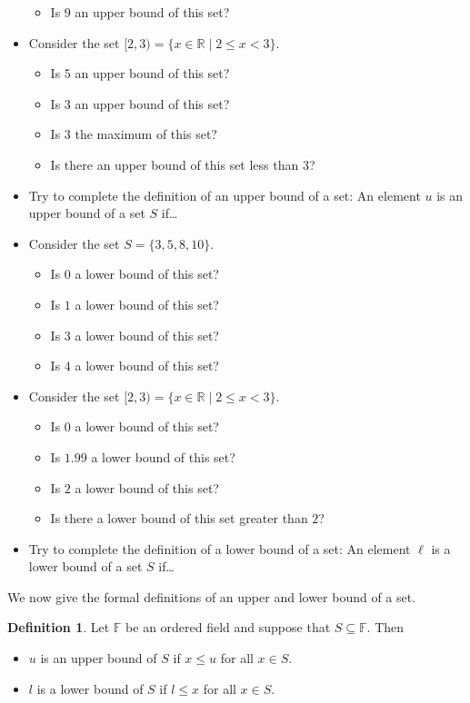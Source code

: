 \documentclass[11pt]{article}
\newenvironment{task}
	{\begin{mdframed}[linecolor=lightgray, linewidth=3pt]\raggedright}
	{\end{mdframed}}
\theoremstyle{definition}
\newtheorem{definition}[theorem]{Definition}
\begin{document}
\begin{task}
\begin{itemize}
\begin{itemize}
        \item Is $9$ an upper bound of this set?
      \end{itemize}
    \item Consider the set $[2,3) = \{ x \in\mathbb{R} \mid 2 \leq x < 3\}$.
        \begin{itemize}
          \item Is $5$ an upper bound of this set?
          \item Is $3$ an upper bound of this set?
          \item Is $3$ the maximum of this set?
          \item Is there an upper bound of this set less than $3$?
        \end{itemize}
      \item Try to complete the definition of an upper bound of a set: An element $u$ is an upper bound of
        a set $S$ if\dots
    \item Consider the set $S = \{ 3, 5, 8, 10\}$.
      \begin{itemize}
        \item Is $0$ a lower bound of this set?
        \item Is $1$ a lower bound of this set?
        \item Is $3$ a lower bound of this set?
        \item Is $4$ a lower bound of this set?
      \end{itemize}
    \item Consider the set $[2,3) = \{ x \in\mathbb{R} \mid 2 \leq x < 3\}$.
        \begin{itemize}
          \item Is $0$ a lower bound of this set?
          \item Is $1.99$ a lower bound of this set?
          \item Is $2$ a lower bound of this set?
          \item Is there a lower bound of this set greater than $2$?
        \end{itemize}
      \item Try to complete the definition of a lower bound of a set: An element $\ell$ is a lower bound of
        a set $S$ if\dots
  \end{itemize}
\end{task}

We now give the formal definitions of an upper and lower bound of a set.

\begin{definition}
  Let $\mathbb{F}$ be an ordered field and suppose that $S\subseteq \mathbb{F}$. Then
  \begin{itemize}
    \item $u$ is an upper bound of $S$ if $x \leq u$ for all $x\in S$.
    \item $l$ is a lower bound of $S$ if $l \leq x$ for all $x\in S$.
  \end{itemize}
\end{definition}
\end{document}
